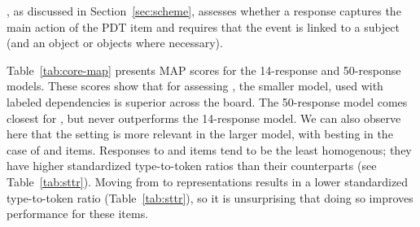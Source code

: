 , as discussed in Section~\ref{sec:scheme}, assesses whether a response captures the main action of the PDT item and requires that the event is linked to a subject (and an object or objects where necessary).

Table~\ref{tab:core-map} presents  MAP scores for the 14-response and 50-response  models. These scores show that for assessing , the smaller model, used with labeled dependencies is superior across the board. The 50-response model comes closest for , but never outperforms the 14-response model. We can also observe here that the  setting is more relevant in the larger model, with  besting  in the case of  and  items. Responses to  and  items tend to  be the least homogenous; they have higher standardized type-to-token ratios than their counterparts (see Table~\ref{tab:sttr}). Moving from  to  representations results in a lower standardized type-to-token ratio (Table~\ref{tab:sttr}), so it is unsurprising that doing so improves performance for these items.

